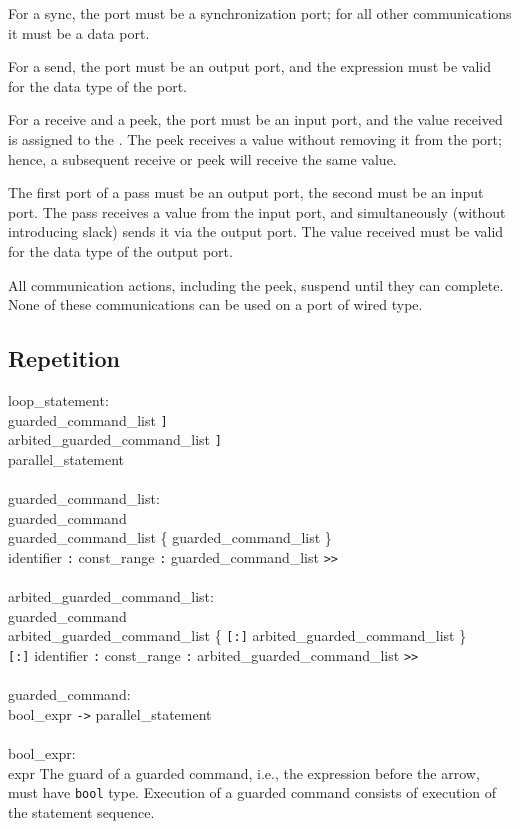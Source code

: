 For a sync,
the port must be a synchronization port; for all other communications it
must be a data port.

For a send, the port must be an output port, and the expression must be
valid for the data type of the port.

For a receive and a peek, the port must be an input port, and the
value received is assigned to the \lvalue. The peek receives a value without
removing it from the port; hence, a subsequent receive or peek will receive
the same value.

The first port of a pass must be an output port, the second must be
an input port. The pass receives a value from the input port, and
simultaneously (without introducing slack) sends it via the output port.
The value received must be valid for the data type of the output port.

All communication actions, including the peek, suspend until they can
complete. None of these communications can be used on a port of wired type.


\subsection{Repetition}\label{sec:loop}

\grammarstart
loop\_statement: \\
       \>{\tt{}*[} guarded\_command\_list {\tt{}]} \\
\orbox \>{\tt{}*[} arbited\_guarded\_command\_list {\tt{}]} \\
\orbox \>{\tt{}*[} parallel\_statement\TSEQ {\tt{}]} \\
 \\
guarded\_command\_list: \\
       \>guarded\_command \\
\orbox \>guarded\_command\_list \{ {\tt{}\orbox} guarded\_command\_list \}\SERIESOPT  \\
\orbox \>{\tt{}<<} {\tt{}\orbox} identifier {\tt{}:} const\_range {\tt{}:} guarded\_command\_list {\tt{}>>} \\
 \\
arbited\_guarded\_command\_list: \\
       \>guarded\_command \\
\orbox \>arbited\_guarded\_command\_list \{ {\tt{}[:]} arbited\_guarded\_command\_list \}\SERIESOPT  \\
\orbox \>{\tt{}<<} {\tt{}[:]} identifier {\tt{}:} const\_range {\tt{}:} arbited\_guarded\_command\_list {\tt{}>>} \\
 \\
guarded\_command: \\
      \>bool\_expr {\tt{}->} parallel\_statement\TSEQ \\
 \\
bool\_expr: \\
      \>expr
\grammarend
The guard of a guarded command, i.e., the expression before the arrow,
must have {\tt{}bool} type. Execution of a guarded command consists of
execution of the statement sequence.

